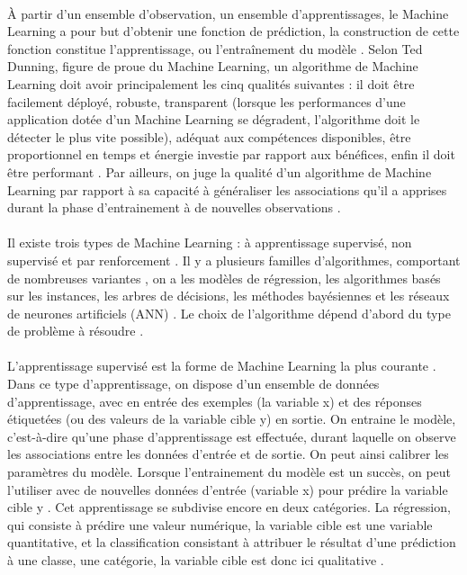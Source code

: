 \documentclass{article}
\begin{document}
\paragraph{}
À partir d’un ensemble d’observation, un ensemble d’apprentissages, le Machine Learning a pour but d’obtenir une fonction de prédiction, la construction de cette fonction constitue l’apprentissage, ou l’entraînement du modèle \cite{lemberger2019big}. Selon Ted Dunning, figure de proue du Machine Learning, un algorithme de Machine Learning doit avoir principalement les cinq qualités suivantes : il doit être facilement déployé, robuste, transparent (lorsque les performances d’une application dotée d’un Machine Learning se dégradent, l’algorithme doit le détecter le plus vite possible), adéquat aux compétences disponibles, être proportionnel en temps et énergie investie par rapport aux bénéfices, enfin il doit être performant \cite{lemberger2019big}. Par ailleurs, on juge la qualité d’un algorithme de Machine Learning par rapport à sa capacité à généraliser les associations qu’il a apprises durant la phase d’entrainement à de nouvelles observations \cite{lemberger2019big}. 
\paragraph{}
Il existe trois types de Machine Learning : à apprentissage supervisé, non supervisé et par renforcement \cite{janiesch2021machine}. Il y a plusieurs familles d’algorithmes, comportant de nombreuses variantes , on a les modèles de régression, les algorithmes basés sur les instances, les arbres de décisions, les méthodes bayésiennes et les réseaux de neurones artificiels (ANN) \cite{janiesch2021machine}. Le choix de l’algorithme dépend d’abord du type de problème à résoudre \cite{lemberger2019big}.
\paragraph{}
L’apprentissage supervisé est la forme de Machine Learning la plus courante \cite{lemberger2019big}. Dans ce type d’apprentissage, on dispose d’un ensemble de données d’apprentissage, avec en entrée des exemples (la variable x) et des réponses étiquetées (ou des valeurs de la variable cible y) en sortie. On entraine le modèle, c’est-à-dire qu’une phase d’apprentissage est effectuée, durant laquelle on observe les associations entre les données d’entrée et de sortie. On peut ainsi calibrer les paramètres du modèle. Lorsque l’entrainement du modèle est un succès, on peut l’utiliser avec de nouvelles données d’entrée (variable x) pour prédire la variable cible y \cite{janiesch2021machine,lemberger2019big}. Cet apprentissage se subdivise encore en deux  catégories. La régression, qui consiste à prédire une valeur numérique, la variable cible est une variable quantitative\cite{lemberger2019big}, et la classification consistant à attribuer le résultat d’une prédiction à une classe, une catégorie, la variable cible est donc ici qualitative \cite{janiesch2021machine,lemberger2019big}.
\end{document}
